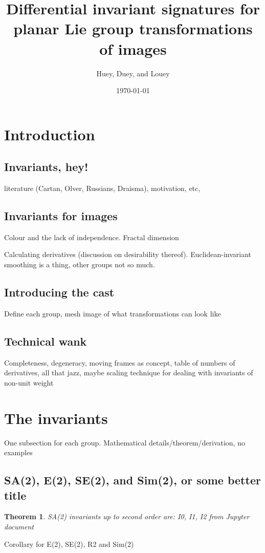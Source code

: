 \documentclass{article}
\title{Differential invariant signatures for planar Lie group transformations of
images}
\date{\today}
\author{Huey, Duey, and Louey}
\newtheorem{theorem}{Theorem}
\begin{document}
\maketitle

\section{Introduction}
\subsection{Invariants, hey!}
literature (Cartan, Olver, Russians, Draisma), motivation, etc,

\subsection{Invariants for images}
Colour and the lack of independence. Fractal dimension 

Calculating derivatives (discussion on desirability thereof).
Euclidean-invariant smoothing is a thing, other groups not so much.

\subsection{Introducing the cast}
Define each group, mesh image of what transformations can look like

\subsection{Technical wank}
Completeness, degeneracy, moving frames as concept, table of numbers of
derivatives, all that jazz, maybe scaling technique
for dealing with invariants of non-unit weight


\section{The invariants}
One subsection for each group. Mathematical details/theorem/derivation, no
examples
\subsection{SA(2), E(2), SE(2), and Sim(2), or some better title}
\begin{theorem}
  SA(2) invariants up to second order are:
  I0, I1, I2 from Jupyter document
\end{theorem}

Corollary for E(2), SE(2), R2 and Sim(2)
\end{document}
